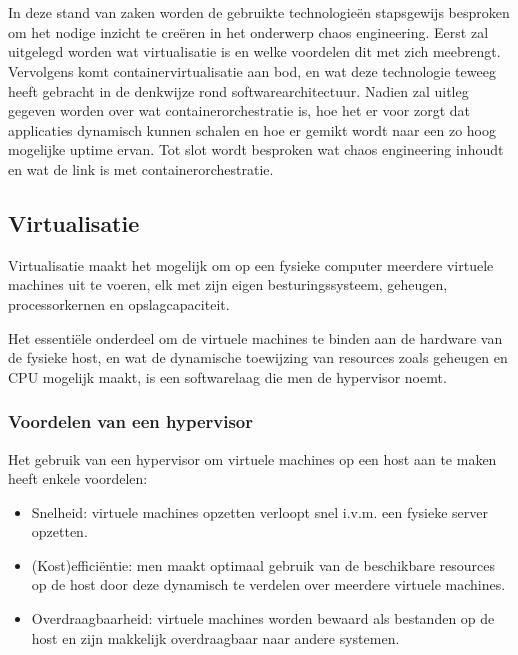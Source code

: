 \chapter{}
\label{ch:stand-van-zaken}


In deze stand van zaken worden de gebruikte technologieën stapsgewijs besproken om het nodige inzicht te creëren in het onderwerp chaos engineering. Eerst zal uitgelegd worden wat virtualisatie is en welke voordelen dit met zich meebrengt.
Vervolgens komt containervirtualisatie aan bod, en wat deze technologie teweeg heeft gebracht in de denkwijze rond softwarearchitectuur. Nadien zal uitleg gegeven worden over wat containerorchestratie is, hoe het er voor zorgt dat applicaties dynamisch kunnen schalen en hoe er gemikt wordt naar een zo hoog mogelijke uptime ervan. Tot slot wordt besproken wat chaos engineering inhoudt en wat de link is met containerorchestratie.   

\section{Virtualisatie}

Virtualisatie maakt het mogelijk om op een fysieke computer meerdere virtuele machines uit te voeren, elk met zijn eigen besturingssysteem, geheugen, processorkernen en opslagcapaciteit.

Het essentiële onderdeel om de virtuele machines te binden aan de hardware van de fysieke host, en wat de dynamische toewijzing van resources zoals geheugen en CPU mogelijk maakt, is een softwarelaag die men de hypervisor noemt. 

\subsection{Voordelen van een hypervisor}

Het gebruik van een hypervisor om virtuele machines op een host aan te maken heeft enkele voordelen:
\begin{itemize}
    \item Snelheid: virtuele machines opzetten verloopt snel i.v.m. een fysieke server opzetten.
    \item (Kost)efficiëntie: men maakt optimaal gebruik van de beschikbare resources op de host door deze dynamisch te verdelen over meerdere virtuele machines.   
    \item Overdraagbaarheid: virtuele machines worden bewaard als bestanden op de host en zijn makkelijk overdraagbaar naar andere systemen.
\end{itemize}

